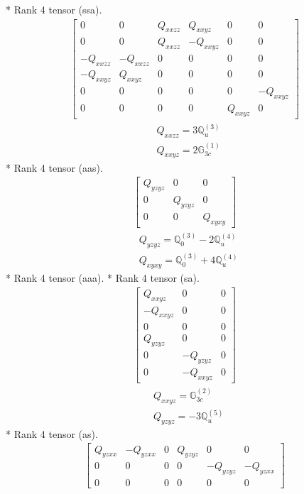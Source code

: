 \documentclass[fleqn,8pt,landscape]{jsarticle}
\begin{document}
* Rank 4 tensor (ssa).
\begin{align*}
\begin{bmatrix} 0 & 0 & Q_{xxzz} & Q_{xxyz} & 0 & 0 \\ 0 & 0 & Q_{xxzz} & - Q_{xxyz} & 0 & 0 \\ - Q_{xxzz} & - Q_{xxzz} & 0 & 0 & 0 & 0 \\ - Q_{xxyz} & Q_{xxyz} & 0 & 0 & 0 & 0 \\ 0 & 0 & 0 & 0 & 0 & - Q_{xxyz} \\ 0 & 0 & 0 & 0 & Q_{xxyz} & 0 \end{bmatrix}
\end{align*}
\begin{align*}
& Q_{xxzz} = 3 \mathbb{Q}_{u}^{(3)} \\
& Q_{xxyz} = 2 \mathbb{G}_{3c}^{(1)}
\end{align*}
* Rank 4 tensor (aas).
\begin{align*}
\begin{bmatrix} Q_{yzyz} & 0 & 0 \\ 0 & Q_{yzyz} & 0 \\ 0 & 0 & Q_{xyxy} \end{bmatrix}
\end{align*}
\begin{align*}
& Q_{yzyz} = \mathbb{Q}_{0}^{(3)} - 2 \mathbb{Q}_{u}^{(4)} \\
& Q_{xyxy} = \mathbb{Q}_{0}^{(3)} + 4 \mathbb{Q}_{u}^{(4)}
\end{align*}
* Rank 4 tensor (aaa).
* Rank 4 tensor (sa).
\begin{align*}
\begin{bmatrix} Q_{xxyz} & 0 & 0 \\ - Q_{xxyz} & 0 & 0 \\ 0 & 0 & 0 \\ Q_{yzyz} & 0 & 0 \\ 0 & - Q_{yzyz} & 0 \\ 0 & - Q_{xxyz} & 0 \end{bmatrix}
\end{align*}
\begin{align*}
& Q_{xxyz} = \mathbb{G}_{3c}^{(2)} \\
& Q_{yzyz} = - 3 \mathbb{Q}_{u}^{(5)}
\end{align*}
* Rank 4 tensor (as).
\begin{align*}
\begin{bmatrix} Q_{yzxx} & - Q_{yzxx} & 0 & Q_{yzyz} & 0 & 0 \\ 0 & 0 & 0 & 0 & - Q_{yzyz} & - Q_{yzxx} \\ 0 & 0 & 0 & 0 & 0 & 0 \end{bmatrix}
\end{align*}
\end{document}
